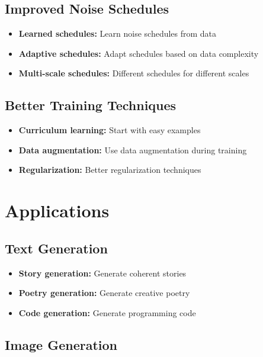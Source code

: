 \subsection{Improved Noise Schedules}

\begin{itemize}
    \item \textbf{Learned schedules:} Learn noise schedules from data
    \item \textbf{Adaptive schedules:} Adapt schedules based on data complexity
    \item \textbf{Multi-scale schedules:} Different schedules for different scales
\end{itemize}

\subsection{Better Training Techniques}

\begin{itemize}
    \item \textbf{Curriculum learning:} Start with easy examples
    \item \textbf{Data augmentation:} Use data augmentation during training
    \item \textbf{Regularization:} Better regularization techniques
\end{itemize}

\section{Applications}

\subsection{Text Generation}

\begin{itemize}
    \item \textbf{Story generation:} Generate coherent stories
    \item \textbf{Poetry generation:} Generate creative poetry
    \item \textbf{Code generation:} Generate programming code
\end{itemize}

\subsection{Image Generation}

